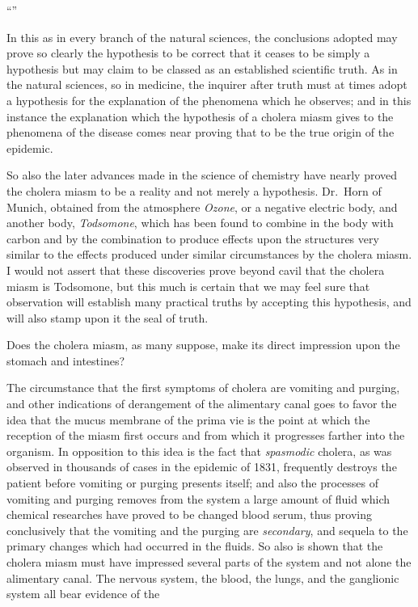 ``''

In this as in every branch of the natural sciences, the conclusions
adopted may prove so clearly the hypothesis to be correct that it ceases
to be simply a hypothesis but may claim to be classed as an established
scientific truth. As in the natural sciences, so in medicine, the inquirer
after truth must at times adopt a hypothesis for the explanation of the
phenomena which he observes; and in this instance the explanation
which the hypothesis of a cholera miasm gives to the phenomena of
the disease comes near proving that to be the true origin of the
epidemic.

So also the later advances made in the science of chemistry have
nearly proved the cholera miasm to be a reality and not merely a
hypothesis. Dr.~Horn of Munich, obtained from the atmosphere
\emph{Ozone}, or a negative electric body, and another body, \emph{Todsomone},
which has been found to combine in the body with carbon and by the
combination to produce effects upon the structures very similar to the
effects produced under similar circumstances by the cholera miasm. I
would not assert that these discoveries prove beyond cavil that the
cholera miasm is Todsomone, but this much is certain that we may feel
sure that observation will establish many practical truths by accepting
this hypothesis, and will also stamp upon it the seal of truth.

\vspace{\baselineskip}

Does the cholera miasm, as many suppose, make its direct impression
upon the stomach and intestines?

The circumstance that the first symptoms of cholera are vomiting and
purging, and other indications of derangement of the alimentary canal
goes to favor the idea that the mucus membrane of the prima vie is the
point at which the reception of the miasm first occurs and from which
it progresses farther into the organism. In opposition to this idea is
the fact that \emph{spasmodic} cholera, as was observed in thousands of cases
in the epidemic of 1831, frequently destroys the patient before vomiting
or purging presents itself; and also the processes of vomiting and
purging removes from the system a large amount of fluid which chemical
researches have proved to be changed blood serum, thus proving
conclusively that the vomiting and the purging are \emph{secondary}, and
sequela to the primary changes which had occurred in the fluids. So
also is shown that the cholera miasm must have impressed several parts
of the system and not alone the alimentary canal. The nervous system,
the blood, the lungs, and the ganglionic system all bear evidence of the\endinput